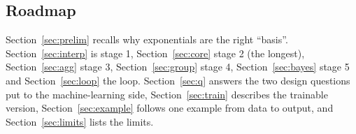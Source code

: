 \subsection{Roadmap}
Section~\ref{sec:prelim} recalls why exponentials are the right ``basis''. Section~\ref{sec:interp} is stage 1, Section~\ref{sec:core} stage 2 (the longest), Section~\ref{sec:agg} stage 3, Section~\ref{sec:group} stage 4, Section~\ref{sec:bayes} stage 5 and Section~\ref{sec:loop} the loop. Section~\ref{sec:q} answers the two design questions put to the machine-learning side, Section~\ref{sec:train} describes the trainable version, Section~\ref{sec:example} follows one example from data to output, and Section~\ref{sec:limits} lists the limits.
